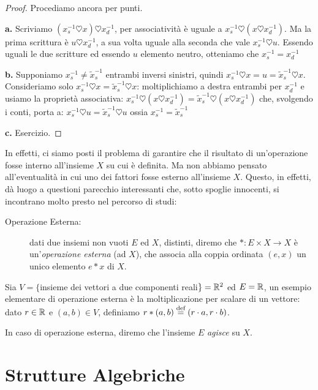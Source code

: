 		\begin{proof}
			Procediamo ancora per punti.
			
			\textbf{a.} Scriviamo $(x_s^{-1}\heartsuit x)\heartsuit x_d^{-1}$, per associatività è uguale a $x_s^{-1}\heartsuit (x\heartsuit x_d^{-1})$. Ma la prima scrittura è $u\heartsuit x_d^{-1}$, a sua volta uguale alla seconda che vale $x_s^{-1}\heartsuit u$. Essendo uguali le due scritture ed essendo $u$ elemento neutro, otteniamo che $x_s^{-1}=x_d^{-1}$
			
			\textbf{b.} Supponiamo $x_s^{-1}\neq \tilde{x}_s^{-1}$ entrambi inversi sinistri, quindi $x_s^{-1}\heartsuit x=u=\tilde{x}_s^{-1}\heartsuit x$. Consideriamo solo $x_s^{-1}\heartsuit x=\tilde{x}_s^{-1}\heartsuit x$: moltiplichiamo a destra entrambi per $x_d^{-1}$ e usiamo la proprietà associativa: $x_s^{-1}\heartsuit (x\heartsuit x_d^{-1})=\tilde{x}_s^{-1}\heartsuit (x\heartsuit x_d^{-1})$ che, svolgendo i conti, porta a: $x_s^{-1}\heartsuit u=\tilde{x}_s^{-1}\heartsuit u$ ossia $x_s^{-1}=\tilde{x}_s^{-1}$
			
			\textbf{c.} Esercizio.
		\end{proof}
		In effetti, ci siamo posti il problema di garantire che il risultato di un'operazione fosse interno all'insieme $X$ su cui è definita. Ma non abbiamo pensato all'eventualità in cui uno dei fattori fosse esterno all'insieme $X$. Questo, in effetti, dà luogo a questioni parecchio interessanti che, sotto spoglie innocenti, si incontrano molto presto nel percorso di studi:
		\begin{description}
			\item[Operazione Esterna:] dati due insiemi non vuoti $E$ ed $X$, distinti, diremo che $\ast:E\times X\to X$ è un'\emph{operazione esterna} (ad $X$), che associa alla coppia ordinata $(e,x)$ un unico elemento $e*x$ di $X$.
		\end{description}
		\begin{eg}
			Sia $V=\{$insieme dei vettori a due componenti reali$\}=\mathbb{R}^2$ ed $E=\mathbb{R}$, un esempio elementare di operazione esterna è la moltiplicazione per scalare di un vettore: dato $r\in\mathbb{R}$ e $(a,b)\in V$, definiamo $r\ast(a,b)\stackrel{\text{def}}{=}(r\cdot a,r\cdot b)$.
		\end{eg}
		In caso di operazione esterna, diremo che l'insieme $E$ \emph{agisce} su $X$.
	
	\section{Strutture Algebriche}
		
